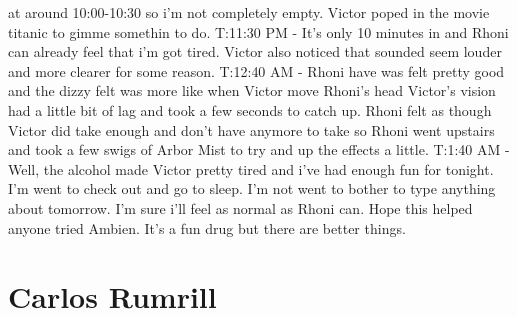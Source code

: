 \documentclass[12pt]{book}
\begin{document}
at around 10:00-10:30 so i'm not completely empty. Victor poped in the movie titanic to gimme somethin to do. T:11:30 PM - It's only 10 minutes in and Rhoni can already feel that i'm got tired. Victor also noticed that sounded seem louder and more clearer for some reason. T:12:40 AM - Rhoni have was felt pretty good and the dizzy felt was more like when Victor move Rhoni's head Victor's vision had a little bit of lag and took a few seconds to catch up. Rhoni felt as though Victor did take enough and don't have anymore to take so Rhoni went upstairs and took a few swigs of Arbor Mist to try and up the effects a little. T:1:40 AM - Well, the alcohol made Victor pretty tired and i've had enough fun for tonight. I'm went to check out and go to sleep. I'm not went to bother to type anything about tomorrow. I'm sure i'll feel as normal as Rhoni can. Hope this helped anyone tried Ambien. It's a fun drug but there are better things.



\chapter{Carlos Rumrill}
\end{document}
